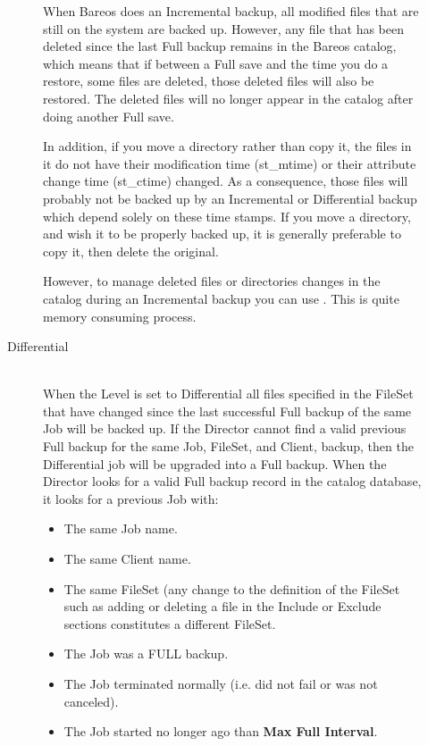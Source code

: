 \begin{description}
\begin{description}
When Bareos does an Incremental backup, all modified files that are
still on the system are backed up.  However, any file that has been
deleted since the last Full backup remains in the Bareos catalog,
which means that if between a Full save and the time you do a
restore, some files are deleted, those deleted files will also be
restored.  The deleted files will no longer appear in the catalog
after doing another Full save.

In addition, if you move a directory rather than copy it, the files in
it do not have their modification time (st\_mtime) or their attribute
change time (st\_ctime) changed.  As a consequence, those files will
probably not be backed up by an Incremental or Differential backup which
depend solely on these time stamps.  If you move a directory, and wish
it to be properly backed up, it is generally preferable to copy it, then
delete the original.

However, to manage deleted files or directories changes in the
catalog during an Incremental backup you can use .
This is quite memory consuming process.

\item [Differential] \hfill \\
When the Level is set to Differential
all files specified in the FileSet that have changed since the last
successful Full backup of the same Job will be backed up.
If the Director cannot find a
valid previous Full backup for the same Job, FileSet, and Client,
backup, then the Differential job will be upgraded into a Full backup.
When the Director looks for a valid Full backup record in the catalog
database, it looks for a previous Job with:

\begin{itemize}
\item The same Job name.
\item The same Client name.
\item The same FileSet (any change to the definition of  the FileSet such as
adding or deleting a file in the  Include or Exclude sections constitutes a
different FileSet.
\item The Job was a FULL backup.
\item The Job terminated normally (i.e. did not fail or was not  canceled).
\item The Job started no longer ago than {\bf Max Full Interval}.
\end{itemize}


\end{description}
\end{description}
